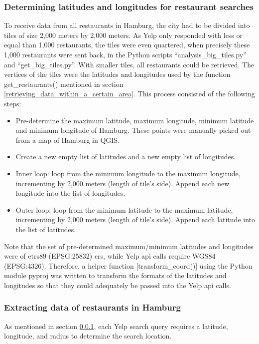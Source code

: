 \documentclass[a4paper, 11pt, oneside]{Thesis}  %
\begin{document}
\subsubsection{Determining latitudes and longitudes for restaurant searches}
\label{Determining_latitudes_and_longitudes_for_restaurant_searches}

To receive data from all restaurants in Hamburg, the city had to be divided into tiles of size 2,000 meters by 2,000 meters. As Yelp only responded with less or equal than 1,000 restaurants, the tiles were even quartered, when precisely these 1,000 restaurants were sent back, in the Python scripts ``analysis\_big\_tiles.py'' and ``get\_big\_tiles.py''. With smaller tiles, all restaurants could be retrieved. The vertices of the tiles were the latitudes and longitudes used by the function get\_restaurants() mentioned in section \ref{retrieving_data_within_a_certain_area}. This process consisted of the following steps:
\begin{itemize}
\item Pre-determine the maximum latitude, maximum longitude, minimum latitude and minimum longitude of Hamburg. These points were manually picked out from a map of Hamburg in QGIS.
\item Create a new empty list of latitudes and a new empty list of longitudes.
\item Inner loop: loop from the minimum longitude to the maximum longitude, incrementing by 2,000 meters (length of tile’s side). Append each new longitude into the list of longitudes.
\item Outer loop: loop from the minimum latitude to the maximum latitude, incrementing by 2,000 meters (length of tile’s side). Append each latitude into the list of latitudes.
\end{itemize}

Note that the set of pre-determined maximum/minimum latitudes and longitudes were of \ac{etrs89} (EPSG:25832) \ac{crs}, while Yelp \ac{api} calls require WGS84 (EPSG:4326). Therefore, a helper function [transform\_coord()] using the Python module pyproj \cite{JeffWhitaker.2018} was written to transform the formats of the latitudes and longitudes so that they could adequately be passed into the Yelp \ac{api} calls.

\subsubsection{Extracting data of restaurants in Hamburg}
\label{Extracting data of restaurants in Hamburg}
As mentioned in section \ref{Determining_latitudes_and_longitudes_for_restaurant_searches}, each Yelp search query requires a latitude, longitude, and radius to determine the search location.
\end{document}
